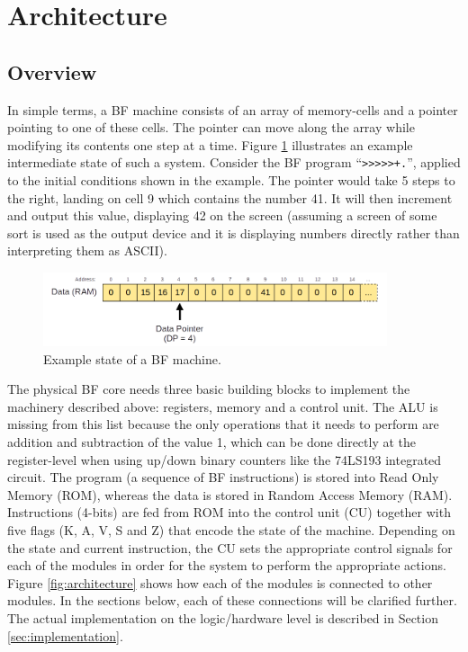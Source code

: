 \section{Architecture} \label{sec:architecture}
\subsection{Overview} \label{sec:architecture:overview}
In simple terms, a BF machine consists of an array of memory-cells and a pointer pointing to one of these cells. The pointer can move along the array while modifying its contents one step at a time. Figure \ref{fig:simplerepresentation} illustrates an example intermediate state of such a system. Consider the BF program ``\texttt{>>>>>+.}'', applied to the initial conditions shown in the example. The pointer would take 5 steps to the right, landing on cell 9 which contains the number 41. It will then increment and output this value, displaying 42 on the screen (assuming a screen of some sort is used as the output device and it is displaying numbers directly rather than interpreting them as ASCII).

\begin{figure}[H]
  \centering
  \includegraphics[width=0.9\textwidth]{img/simple_representation}
  \caption{Example state of a BF machine.}
  \label{fig:simplerepresentation}
\end{figure}


The physical BF core needs three basic building blocks to implement the machinery described above: registers, memory and a control unit. The ALU is missing from this list because the only operations that it needs to perform are addition and subtraction of the value 1, which can be done directly at the register-level when using up/down binary counters like the 74LS193 integrated circuit. The program (a sequence of BF instructions) is stored into Read Only Memory (ROM), whereas the data is stored in Random Access Memory (RAM). Instructions (4-bits) are fed from ROM into the control unit (CU) together with five flags (K, A, V, S and Z) that encode the state of the machine. Depending on the state and current instruction, the CU sets the appropriate control signals for each of the modules in order for the system to perform the appropriate actions. Figure \ref{fig:architecture} shows how each of the modules is connected to other modules. In the sections below, each of these connections will be clarified further. The actual implementation on the logic/hardware level is described in Section \ref{sec:implementation}.

